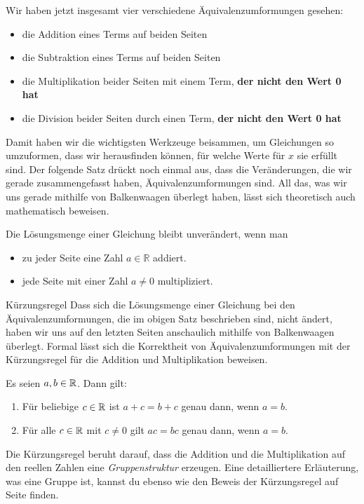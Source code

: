 \documentclass[../../main.tex]{subfiles}
\begin{document}
Wir haben jetzt insgesamt vier verschiedene Äquivalenzumformungen gesehen:
\begin{itemize}
    \item die Addition eines Terms auf beiden Seiten
    \item die Subtraktion eines Terms auf beiden Seiten
    \item die Multiplikation beider Seiten mit einem Term, \textbf{der nicht den Wert 0 hat}
    \item die Division beider Seiten durch einen Term, \textbf{der nicht den Wert 0 hat}
\end{itemize}

Damit haben wir die wichtigsten Werkzeuge beisammen, um Gleichungen so umzuformen, dass wir herausfinden können, für welche Werte für $x$ sie erfüllt sind. Der folgende Satz drückt noch einmal aus, dass die Veränderungen, die wir gerade zusammengefasst haben, Äquivalenzumformungen sind. All das, was wir uns gerade mithilfe von Balkenwaagen überlegt haben, lässt sich theoretisch auch mathematisch beweisen.

\begin{theorem}[Äquivalenzumformungen]
    Die Lösungsmenge einer Gleichung bleibt unverändert, wenn man
    \begin{itemize}
        \item zu jeder Seite eine Zahl $a\in\mathbb{R}$ addiert.
        \item jede Seite mit einer Zahl $a\neq 0$ multipliziert.
    \end{itemize}
\end{theorem}
\begin{advanced}{Kürzungsregel}
    Dass sich die Lösungsmenge einer Gleichung bei den Äquivalenzumformungen, die im obigen Satz beschrieben sind, nicht ändert, haben wir uns auf den letzten Seiten anschaulich mithilfe von Balkenwaagen überlegt. Formal lässt sich die Korrektheit von Äquivalenzumformungen mit der Kürzungsregel für die Addition und Multiplikation beweisen.
    
    \begin{theorem}[Kürzungsregel]
        Es seien $a,b\in\mathbb{R}$. Dann gilt: 
        \begin{enumerate}
            \item Für beliebige $c\in\mathbb{R}$ ist $a+c=b+c$ genau dann, wenn $a=b$.
            \item Für alle $c\in\mathbb{R}$ mit $c\neq 0$ gilt $ac=bc$ genau dann, wenn $a=b$.
        \end{enumerate}
    \end{theorem}
    
    Die Kürzungsregel beruht darauf, dass die Addition und die Multiplikation auf den reellen Zahlen eine \emph{Gruppenstruktur} erzeugen. Eine detailliertere Erläuterung, was eine Gruppe ist, kannst du ebenso wie den Beweis der Kürzungsregel auf Seite \pageref{} finden. 
\end{advanced}
\end{document}
